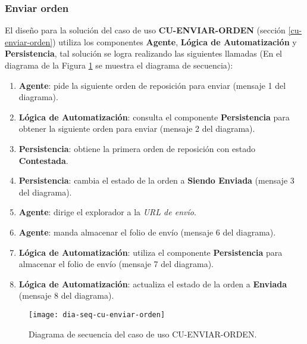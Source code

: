 \subsubsection{Enviar orden}
El diseño para la solución del caso de uso \textbf{CU-ENVIAR-ORDEN} (sección \ref{cu-enviar-orden}) utiliza los componentes \textbf{Agente}, \textbf{Lógica de Automatización} y \textbf{Persistencia}, tal solución se logra realizando las siguientes llamadas (En el diagrama de la Figura \ref{fig:dia-seq-cu-enviar-orden} se muestra el diagrama de secuencia):
\begin{enumerate}
	\item \textbf{Agente}: pide la siguiente orden de reposición para enviar (mensaje 1 del diagrama).
	\item \textbf{Lógica de Automatización}: consulta el componente \textbf{Persistencia} para obtener la siguiente orden para enviar (mensaje 2 del diagrama).
	\item \textbf{Persistencia}: obtiene la primera orden de reposición con estado \textbf{Contestada}.
	\item \textbf{Persistencia}: cambia el estado de la orden a \textbf{Siendo Enviada} (mensaje 3 del diagrama).
	\item \textbf{Agente}: dirige el explorador a la \textit{URL de envío}.
	\item \textbf{Agente}: manda almacenar el folio de envío (mensaje 6 del diagrama).
	\item \textbf{Lógica de Automatización}: utiliza el componente \textbf{Persistencia} para almacenar el folio de envío (mensaje 7 del diagrama).
	\item \textbf{Lógica de Automatización}: actualiza el estado de la orden a \textbf{Enviada} (mensaje 8 del diagrama).
\end{enumerate}

\begin{figure}[h]
	\centering
	\texttt{[image: dia-seq-cu-enviar-orden]}
	\caption{Diagrama de secuencia del caso de uso CU-ENVIAR-ORDEN.}
	\label{fig:dia-seq-cu-enviar-orden}
\end{figure}

